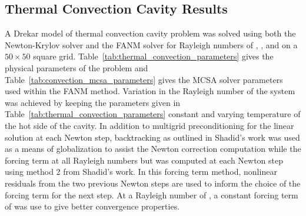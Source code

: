 \subsection{Thermal Convection Cavity Results}
\label{subsec:thermal_convection_verification}

A Drekar model of thermal convection cavity problem was solved using
both the Newton-Krylov solver and the FANM solver for Rayleigh numbers
of , ,  and  on a $50 \times 50$
square grid. Table~\ref{tab:thermal_convection_parameters} gives the
physical parameters of the problem and
Table~\ref{tab:convection_mcsa_parameters} gives the MCSA solver
parameters used within the FANM method. Variation in the Rayleigh
number of the system was achieved by keeping the parameters given in
Table~\ref{tab:thermal_convection_parameters} constant and varying
temperature of the hot side of the cavity. In addition to multigrid
preconditioning for the linear solution at each Newton step,
backtracking as outlined in Shadid's work \cite{shadid_inexact_1997}
was used as a means of globalization to assist the Newton correction
computation while the forcing term at all Rayleigh numbers but
 was computed at each Newton step using method 2 from
Shadid's work. In this forcing term method, nonlinear residuals from
the two previous Newton steps are used to inform the choice of the
forcing term for the next step. At a Rayleigh number of , a
constant forcing term of  was use to give better convergence
properties.


